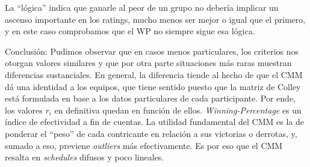 La ``l\'ogica'' indica que ganarle al peor de un grupo no deber\'ia implicar un ascenso importante en los ratings, mucho menos ser mejor o igual que el primero, y en este caso comprobamos que el WP no siempre sigue esa l\'ogica.

Conclusi\'on: Pudimos observar que en casos menos particulares, los criterios nos otorgan valores similares y que por otra parte situaciones m\'as raras muestran diferencias sustanciales. En general, la diferencia tiende al hecho de que el CMM dá una identidad a los equipos, que tiene sentido puesto que la matriz de Colley está formulada en base a los datos particulares de cada participante. Por ende, los valores $r_{i}$ en definitiva quedan en funci\'on de ellos. \textit{Winning-Percentage} es un \'indice de efectividad a fin de cuentas. La utilidad fundamental del CMM es la de ponderar el ``peso'' de cada contricante en relaci\'on a sus victorias o derrotas, y, sumado a eso, previene \textit{outliers} m\'as efectivamente. Es por eso que el CMM resalta en \textit{schedules} difusos y poco lineales.